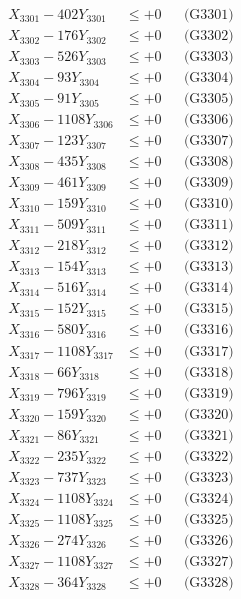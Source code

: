 \documentclass[a4paper,10pt]{article}
\begin{document}
{\begin{align}
\allowbreak
X_{3301} - 402Y_{3301} &\leq +0 && \text{(G3301)} \\
X_{3302} - 176Y_{3302} &\leq +0 && \text{(G3302)} \\
X_{3303} - 526Y_{3303} &\leq +0 && \text{(G3303)} \\
X_{3304} - 93Y_{3304} &\leq +0 && \text{(G3304)} \\
X_{3305} - 91Y_{3305} &\leq +0 && \text{(G3305)} \\
X_{3306} - 1108Y_{3306} &\leq +0 && \text{(G3306)} \\
X_{3307} - 123Y_{3307} &\leq +0 && \text{(G3307)} \\
X_{3308} - 435Y_{3308} &\leq +0 && \text{(G3308)} \\
X_{3309} - 461Y_{3309} &\leq +0 && \text{(G3309)} \\
X_{3310} - 159Y_{3310} &\leq +0 && \text{(G3310)} \\
\allowbreak
X_{3311} - 509Y_{3311} &\leq +0 && \text{(G3311)} \\
X_{3312} - 218Y_{3312} &\leq +0 && \text{(G3312)} \\
X_{3313} - 154Y_{3313} &\leq +0 && \text{(G3313)} \\
X_{3314} - 516Y_{3314} &\leq +0 && \text{(G3314)} \\
X_{3315} - 152Y_{3315} &\leq +0 && \text{(G3315)} \\
X_{3316} - 580Y_{3316} &\leq +0 && \text{(G3316)} \\
X_{3317} - 1108Y_{3317} &\leq +0 && \text{(G3317)} \\
X_{3318} - 66Y_{3318} &\leq +0 && \text{(G3318)} \\
X_{3319} - 796Y_{3319} &\leq +0 && \text{(G3319)} \\
X_{3320} - 159Y_{3320} &\leq +0 && \text{(G3320)} \\
\allowbreak
X_{3321} - 86Y_{3321} &\leq +0 && \text{(G3321)} \\
X_{3322} - 235Y_{3322} &\leq +0 && \text{(G3322)} \\
X_{3323} - 737Y_{3323} &\leq +0 && \text{(G3323)} \\
X_{3324} - 1108Y_{3324} &\leq +0 && \text{(G3324)} \\
X_{3325} - 1108Y_{3325} &\leq +0 && \text{(G3325)} \\
X_{3326} - 274Y_{3326} &\leq +0 && \text{(G3326)} \\
X_{3327} - 1108Y_{3327} &\leq +0 && \text{(G3327)} \\
X_{3328} - 364Y_{3328} &\leq +0 && \text{(G3328)} \\

\end{align}}
\end{document}
